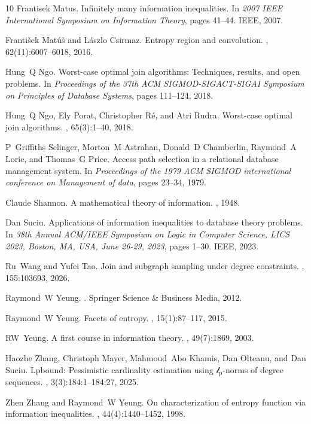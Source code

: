 \documentclass[a4paper,cleveref]{lipics-v2021}
\begin{document}
\begin{thebibliography}{10}
Frantisek Matus.
\newblock Infinitely many information inequalities.
\newblock In {\em 2007 IEEE International Symposium on Information Theory},
  pages 41--44. IEEE, 2007.

Franti{\v{s}}ek Mat{\'u}{\v{s}} and L{\'a}szlo Csirmaz.
\newblock Entropy region and convolution.
, 62(11):6007--6018,
  2016.

Hung~Q Ngo.
\newblock Worst-case optimal join algorithms: Techniques, results, and open
  problems.
\newblock In {\em Proceedings of the 37th ACM SIGMOD-SIGACT-SIGAI Symposium on
  Principles of Database Systems}, pages 111--124, 2018.

Hung~Q Ngo, Ely Porat, Christopher R{\'e}, and Atri Rudra.
\newblock Worst-case optimal join algorithms.
, 65(3):1--40, 2018.

P~Griffiths Selinger, Morton~M Astrahan, Donald~D Chamberlin, Raymond~A Lorie,
  and Thomas~G Price.
\newblock Access path selection in a relational database management system.
\newblock In {\em Proceedings of the 1979 ACM SIGMOD international conference
  on Management of data}, pages 23--34, 1979.

Claude Shannon.
\newblock A mathematical theory of information.
, 1948.

Dan Suciu.
\newblock Applications of information inequalities to database theory problems.
\newblock In {\em 38th Annual {ACM/IEEE} Symposium on Logic in Computer
  Science, {LICS} 2023, Boston, MA, USA, June 26-29, 2023}, pages 1--30.
  {IEEE}, 2023.

Ru~Wang and Yufei Tao.
\newblock Join and subgraph sampling under degree constraints.
, 155:103693, 2026.

Raymond~W Yeung.
.
\newblock Springer Science \& Business Media, 2012.

Raymond~W Yeung.
\newblock Facets of entropy.
, 15(1):87--117, 2015.

RW~Yeung.
\newblock A first course in information theory.
, 49(7):1869, 2003.

Haozhe Zhang, Christoph Mayer, Mahmoud~Abo Khamis, Dan Olteanu, and Dan Suciu.
\newblock Lpbound: Pessimistic cardinality estimation using
  {\(\mathscr{l}\)}\({}_{\mbox{p}}\)-norms of degree sequences.
, 3(3):184:1--184:27, 2025.

Zhen Zhang and Raymond~W Yeung.
\newblock On characterization of entropy function via information inequalities.
, 44(4):1440--1452,
  1998.

\end{thebibliography}
\end{document}
